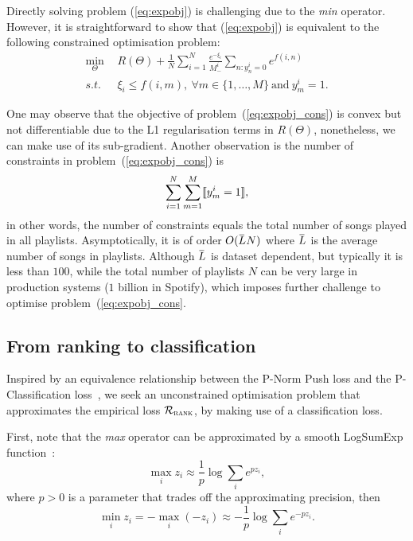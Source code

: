 Directly solving problem (\ref{eq:expobj}) is challenging due to the \emph{min} operator.
However, it is straightforward to show that (\ref{eq:expobj}) is equivalent to the following constrained optimisation problem:
\begin{equation}
\label{eq:expobj_cons}
\begin{aligned}
\min_{\Theta} \ \, & R(\Theta) + \frac{1}{N} \sum_{i=1}^N \frac{e^{-\xi_i}}{M_-^i} \sum_{n: y_n^i = 0} e^{f(i, n)} \\
s.t. \ \, & \xi_i \le f(i, m), \ \forall m \in \{1,\dots,M\} \ \text{and} \ y_m^i = 1.
\end{aligned}
\end{equation}

One may observe that the objective of problem~(\ref{eq:expobj_cons}) is convex but not differentiable due to the L1 regularisation terms in $R(\Theta)$,
nonetheless, we can make use of its sub-gradient.
Another observation is the number of constraints in problem~(\ref{eq:expobj_cons}) is 
$$
\sum_{i=1}^N \sum_{m=1}^M \llbracket y_m^i = 1 \rrbracket,
$$
in other words, the number of constraints equals the total number of songs played in all playlists.
Asymptotically, it is of order $O(\widebar{L} N)$ where $\widebar{L}$ is the average number of songs in playlists.
Although $\widebar{L}$ is dataset dependent, but typically it is less than $100$, 
while the total number of playlists $N$ can be very large in production systems (\eg $1$ billion in Spotify),
which imposes further challenge to optimise problem~(\ref{eq:expobj_cons}.



\subsection{From ranking to classification}

Inspired by an equivalence relationship between the P-Norm Push loss and the P-Classification loss~\cite{},
we seek an unconstrained optimisation problem that approximates the empirical loss $\mathcal{R}_\textsc{rank}$,
by making use of a classification loss.

First, note that the \emph{max} operator can be approximated by a smooth LogSumExp function~\cite{}:
$$
\max_i z_i \approx \frac{1}{p} \log \sum_i e^{p z_i},
$$
where $p > 0$ is a parameter that trades off the approximating precision, then
$$
\min_i z_i = -\max_i (-z_i) \approx -\frac{1}{p} \log \sum_i e^{-p z_i}.
$$


